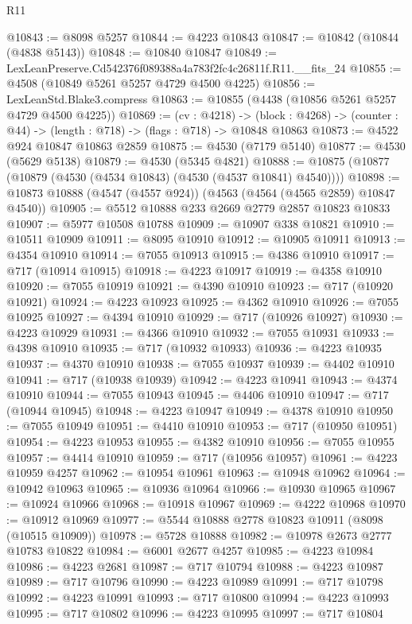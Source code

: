 \begin{lexlean}{R11}
\begin{coremodule}
@10843 := @8098 @5257
@10844 := @4223 @10843
@10847 := @10842 (@10844 (@4838 @5143))
@10848 := @10840 @10847
@10849 := LexLeanPreserve.Cd542376f089388a4a783f2fc4c26811f.R11.__fits_24
@10855 := @4508 (@10849 @5261 @5257 @4729 @4500 @4225)
@10856 := LexLeanStd.Blake3.compress
@10863 := @10855 (@4438 (@10856 @5261 @5257 @4729 @4500 @4225))
@10869 := (cv : @4218) ->
  (block : @4268) -> (counter : @44) -> (length : @718) -> (flags : @718) -> @10848 @10863
@10873 := @4522 @924 @10847 @10863 @2859
@10875 := @4530 (@7179 @5140)
@10877 := @4530 (@5629 @5138)
@10879 := @4530 (@5345 @4821)
@10888 := @10875 (@10877 (@10879 (@4530 (@4534 @10843) (@4530 (@4537 @10841) @4540))))
@10898 := @10873 @10888 (@4547 (@4557 @924)) (@4563 (@4564 (@4565 @2859) @10847 @4540))
@10905 := @5512 @10888 @233 @2669 @2779 @2857 @10823 @10833
@10907 := @5977 @10508 @10788
@10909 := @10907 @338 @10821
@10910 := @10511 @10909
@10911 := @8095 @10910
@10912 := @10905 @10911
@10913 := @4354 @10910
@10914 := @7055 @10913
@10915 := @4386 @10910
@10917 := @717 (@10914 @10915)
@10918 := @4223 @10917
@10919 := @4358 @10910
@10920 := @7055 @10919
@10921 := @4390 @10910
@10923 := @717 (@10920 @10921)
@10924 := @4223 @10923
@10925 := @4362 @10910
@10926 := @7055 @10925
@10927 := @4394 @10910
@10929 := @717 (@10926 @10927)
@10930 := @4223 @10929
@10931 := @4366 @10910
@10932 := @7055 @10931
@10933 := @4398 @10910
@10935 := @717 (@10932 @10933)
@10936 := @4223 @10935
@10937 := @4370 @10910
@10938 := @7055 @10937
@10939 := @4402 @10910
@10941 := @717 (@10938 @10939)
@10942 := @4223 @10941
@10943 := @4374 @10910
@10944 := @7055 @10943
@10945 := @4406 @10910
@10947 := @717 (@10944 @10945)
@10948 := @4223 @10947
@10949 := @4378 @10910
@10950 := @7055 @10949
@10951 := @4410 @10910
@10953 := @717 (@10950 @10951)
@10954 := @4223 @10953
@10955 := @4382 @10910
@10956 := @7055 @10955
@10957 := @4414 @10910
@10959 := @717 (@10956 @10957)
@10961 := @4223 @10959 @4257
@10962 := @10954 @10961
@10963 := @10948 @10962
@10964 := @10942 @10963
@10965 := @10936 @10964
@10966 := @10930 @10965
@10967 := @10924 @10966
@10968 := @10918 @10967
@10969 := @4222 @10968
@10970 := @10912 @10969
@10977 := @5544 @10888 @2778 @10823 @10911 (@8098 (@10515 @10909))
@10978 := @5728 @10888
@10982 := @10978 @2673 @2777 @10783 @10822
@10984 := @6001 @2677 @4257
@10985 := @4223 @10984
@10986 := @4223 @2681
@10987 := @717 @10794
@10988 := @4223 @10987
@10989 := @717 @10796
@10990 := @4223 @10989
@10991 := @717 @10798
@10992 := @4223 @10991
@10993 := @717 @10800
@10994 := @4223 @10993
@10995 := @717 @10802
@10996 := @4223 @10995
@10997 := @717 @10804

\end{coremodule}
\end{lexlean}
